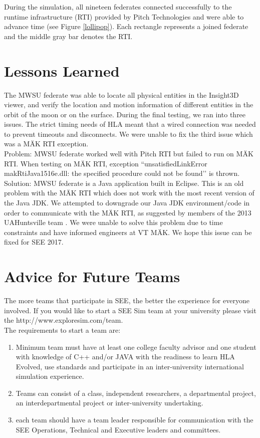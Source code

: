 \documentclass[journal, onecolumn]{IEEEtran}
\newcommand\tab[1][0.5cm]{\hspace*{#1}}
\begin{document}
During the simulation, all nineteen federates connected successfully to the runtime infrastructure (RTI) provided by Pitch Technologies and were able to advance time (see Figure \ref{lollipop}). Each rectangle represents a joined federate and the middle gray bar denotes the RTI.

\section{Lessons Learned}
The MWSU federate was able to locate all physical entities in the Insight3D viewer, and verify the location and motion information of different entities in the orbit of the moon or on the surface. During the final testing, we ran into three issues. The strict timing needs of HLA meant that a wired connection was needed to prevent timeouts and disconnects. We were unable to fix the third issue which was a M{\"A}K RTI exception.\\
\tab Problem: MWSU federate worked well with Pitch RTI but failed to run on M{\"A}K RTI. When testing on M{\"A}K RTI, exception ``unsatisfiedLinkError makRtiJava1516e.dll: the specified procedure could not be found\rq\rq{} is thrown.\\
\tab Solution: MWSU federate is a Java application built in Eclipse. This is an old problem with  the M{\"A}K RTI which does not work with the most recent version of the Java JDK. We attempted to downgrade our Java JDK environment/code in order to communicate with the M{\"A}K RTI, as suggested by members of the 2013 UAHuntsville team \cite{bulgatz2012design}. We were unable to solve this problem due to time constraints and have informed engineers at VT M{\"A}K. We hope this issue can be fixed for SEE 2017.

\section{Advice for Future Teams}
The more teams that participate in SEE, the better the experience for everyone involved.  If you would like to start a SEE Sim team at your university please visit the http://www.exploresim.com/team.\\
The requirements to start a team are:
\begin{enumerate}
	\item Minimum team must have at least one college faculty advisor and one student with knowledge of C++ and/or JAVA with the readiness to learn HLA 	Evolved, use standards and participate in an inter-university international simulation experience.  
	\item Teams can consist of a class, independent researchers, a departmental project, an interdepartmental project or inter-university undertaking.
	\item each team should have a team leader responsible for communication with the SEE Operations, Technical and Executive leaders and committees.
\end{enumerate}
\end{document}
